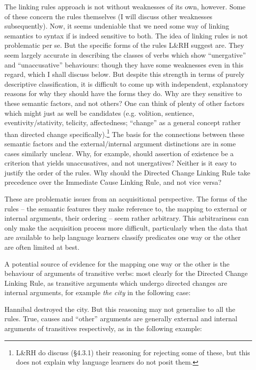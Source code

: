 \documentclass[output=paper]{langsci/langscibook}
\begin{document}
The linking rules approach is not without weaknesses of its own, however. Some
of these concern the rules themselves (I will discuss other weaknesses
subsequently). Now, it seems undeniable that we need some way of linking
semantics to syntax if  is indeed sensitive to both. The
idea of linking rules is not problematic per se. But the specific forms of the
rules L\&RH suggest are.  They seem largely accurate in describing the classes
of verbs which show \enquote{unergative} and \enquote{unaccusative} behaviours:
though they have some weaknesses even in this regard, which I shall discuss
below. But despite this strength in terms of purely descriptive classification,
it is difficult to come up with independent, explanatory reasons for why they
should have the forms they do. Why are they sensitive to these semantic
factors, and not others? One can think of plenty of other factors which might
just as well be candidates (e.g. volition, sentience, eventivity/stativity,
telicity, affectedness; \enquote{change} as a general concept rather than
directed change specifically).\footnote{L\&RH do discuss (§4.3.1) their
reasoning for rejecting some of these, but this does not explain why language
learners do not posit them.}  The basis for the connections between these
semantic factors and the external/internal argument distinctions are in some
cases similarly unclear. Why, for example, should assertion of existence be a
criterion that yields unaccusatives, and not unergatives? Neither is it easy to
justify the order of the rules. Why should the Directed Change Linking Rule
take precedence over the Immediate Cause Linking Rule, and not vice versa?

These are problematic issues from an acquisitional perspective. The forms of
the rules – the semantic features they make reference to, the mapping to
external or internal arguments, their ordering – seem rather arbitrary. This
arbitrariness can only make the acquisition process more difficult,
particularly when the data that are available to help language learners
classify predicates one way or the other are often limited at best.{}

A potential source of evidence for the mapping one way or the other is the
behaviour of arguments of transitive verbs: most clearly for the Directed
Change Linking Rule, as transitive arguments which undergo directed changes are
internal arguments, for example \emph{the city} in the following case:

\ea Hannibal destroyed the city.\z
But this reasoning may not generalise to all the rules. True, causes and
\enquote{other} arguments are generally external and internal arguments of
transitives respectively, as in the following example:
\end{document}
